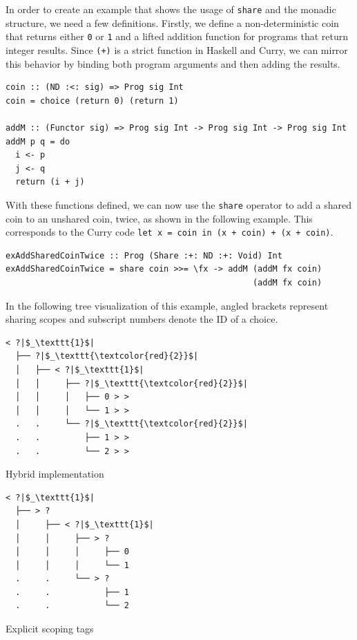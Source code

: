 \documentclass[a4paper, 11pt, fleqn, twoside, abstract=on]{scrreprt}
\newcommand{\hinl}[1]{\texttt{#1}}
\begin{document}
In order to create an example that shows the usage of \hinl{share} and the monadic structure, we need a few definitions.
Firstly, we define a non-deterministic coin that returns either \hinl{0} or \hinl{1} and a lifted addition function for programs that return integer results.
Since \hinl{(+)} is a strict function in Haskell and Curry, we can mirror this behavior by binding both program arguments and then adding the results.

\begin{verbatim}
coin :: (ND :<: sig) => Prog sig Int
coin = choice (return 0) (return 1)

addM :: (Functor sig) => Prog sig Int -> Prog sig Int -> Prog sig Int
addM p q = do
  i <- p 
  j <- q 
  return (i + j)
\end{verbatim}
\noindent
With these functions defined, we can now use the \hinl{share} operator to add a shared coin to an unshared coin, twice, as shown in the following example.
This corresponds to the Curry code \hinl{let x = coin in (x + coin) + (x + coin)}.

\begin{verbatim}
exAddSharedCoinTwice :: Prog (Share :+: ND :+: Void) Int
exAddSharedCoinTwice = share coin >>= \fx -> addM (addM fx coin) 
                                                  (addM fx coin)
\end{verbatim}
\noindent
In the following tree visualization of this example, angled brackets represent sharing scopes and subscript numbers denote the ID of a choice.

\vspace{0.32cm}
\begin{minipage}{.4 \linewidth}
\begin{verbatim}
< ?|$_\texttt{1}$|
  ├── ?|$_\texttt{\textcolor{red}{2}}$|
  │   ├── < ?|$_\texttt{1}$|
  │   │     ├── ?|$_\texttt{\textcolor{red}{2}}$|
  │   │     │   ├── 0 > >
  │   │     │   └── 1 > >
  .   .     └── ?|$_\texttt{\textcolor{red}{2}}$|
  .   .         ├── 1 > >
  .   .         └── 2 > >
\end{verbatim}
\begin{center}
Hybrid implementation
\end{center}
\end{minipage}
\hspace{.1 \linewidth}
\vline
\hspace{.1 \linewidth}
\begin{minipage}{.475 \linewidth}
\begin{verbatim}
< ?|$_\texttt{1}$|
  ├── > ? 
  │     ├── < ?|$_\texttt{1}$|
  │     │     ├── > ? 
  │     │     │     ├── 0
  │     │     │     └── 1
  .     .     └── > ? 
  .     .           ├── 1
  .     .           └── 2
\end{verbatim}
Explicit scoping tags
\end{minipage}
\end{document}

